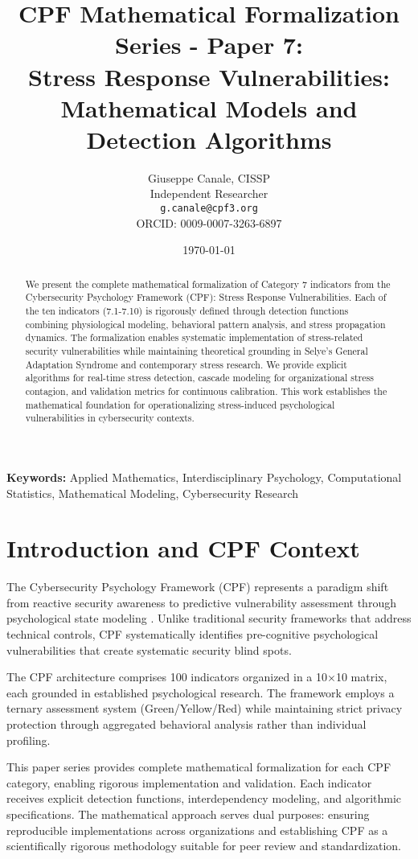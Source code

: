 \documentclass[11pt,a4paper]{article}
\title{CPF Mathematical Formalization Series - Paper 7:\\Stress Response Vulnerabilities: Mathematical Models and Detection Algorithms}
\author{
    Giuseppe Canale, CISSP\\
    Independent Researcher\\
    \texttt{g.canale@cpf3.org}\\
    ORCID: 0009-0007-3263-6897
}
\date{\today}
\begin{document}
\maketitle

\begin{abstract}
We present the complete mathematical formalization of Category 7 indicators from the Cybersecurity Psychology Framework (CPF): Stress Response Vulnerabilities. Each of the ten indicators (7.1-7.10) is rigorously defined through detection functions combining physiological modeling, behavioral pattern analysis, and stress propagation dynamics. The formalization enables systematic implementation of stress-related security vulnerabilities while maintaining theoretical grounding in Selye's General Adaptation Syndrome and contemporary stress research. We provide explicit algorithms for real-time stress detection, cascade modeling for organizational stress contagion, and validation metrics for continuous calibration. This work establishes the mathematical foundation for operationalizing stress-induced psychological vulnerabilities in cybersecurity contexts.
\end{abstract}

\textbf{Keywords:} Applied Mathematics, Interdisciplinary Psychology, Computational Statistics, Mathematical Modeling, Cybersecurity Research

\section{Introduction and CPF Context}

The Cybersecurity Psychology Framework (CPF) represents a paradigm shift from reactive security awareness to predictive vulnerability assessment through psychological state modeling \cite{canale2024cpf}. Unlike traditional security frameworks that address technical controls, CPF systematically identifies pre-cognitive psychological vulnerabilities that create systematic security blind spots.

The CPF architecture comprises 100 indicators organized in a 10×10 matrix, each grounded in established psychological research. The framework employs a ternary assessment system (Green/Yellow/Red) while maintaining strict privacy protection through aggregated behavioral analysis rather than individual profiling.

This paper series provides complete mathematical formalization for each CPF category, enabling rigorous implementation and validation. Each indicator receives explicit detection functions, interdependency modeling, and algorithmic specifications. The mathematical approach serves dual purposes: ensuring reproducible implementations across organizations and establishing CPF as a scientifically rigorous methodology suitable for peer review and standardization.
\end{document}
